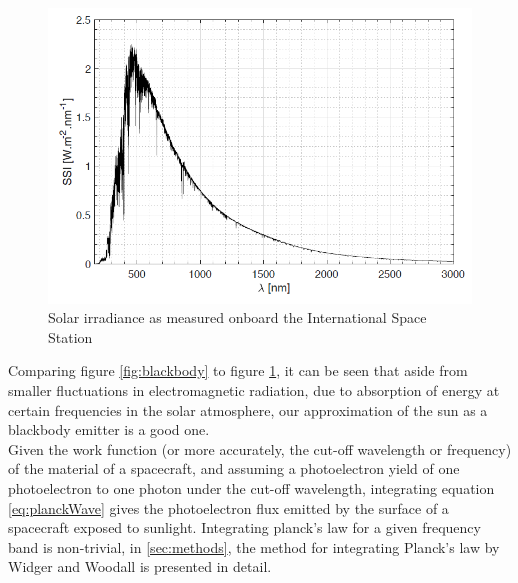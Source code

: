 \begin{figure}
    \centering
    \includegraphics[scale=0.6]{figures/ReferenceFigures/solarspectrum.png}
    \caption{Solar irradiance as measured onboard the International Space Station}
    \label{fig:solIrradiance}
\end{figure}

\newpage

Comparing figure \ref{fig:blackbody} to figure \ref{fig:solIrradiance}, it can be seen that aside from smaller fluctuations in electromagnetic radiation, due to absorption of energy at certain frequencies in the solar atmosphere, our approximation of the sun as a blackbody emitter is a good one. 
\\
Given the work function (or more accurately, the cut-off wavelength or frequency) of the material of a spacecraft, and assuming a photoelectron yield of one photoelectron to one photon under the cut-off wavelength, integrating equation \eqref{eq:planckWave} gives the photoelectron flux emitted by the surface of a spacecraft exposed to sunlight. Integrating planck's law for a given frequency band is non-trivial, in \ref{sec:methods}, the method for integrating Planck's law by Widger and Woodall \parencite{Widger1976} is presented in detail. 


